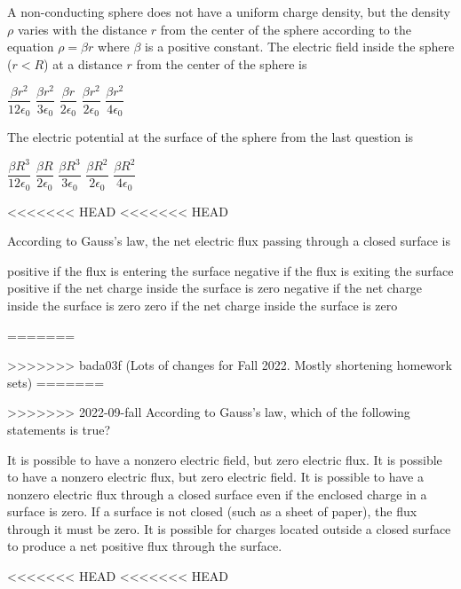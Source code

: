 \documentclass{../../oss-apphys-exam}
\newcounter{last}
\begin{document}
\genheader


\raggedcolumns

\begin{multicols*}{2}
  \begin{questions}

    \question A non-conducting sphere does not have a uniform charge density,
    but the density $\rho$ varies with the distance $r$ from the center of the
    sphere according to the equation $\rho=\beta r$ where $\beta$ is a positive
    constant. The electric field inside the sphere ($r<R$) at a distance $r$
    from the center of the sphere is
    \begin{choices}
      \choice $\dfrac{\beta r^2}{12\epsilon_0}$
      \choice $\dfrac{\beta r^2}{3\epsilon_0}$
      \choice $\dfrac{\beta r}{2\epsilon_0}$
      \choice $\dfrac{\beta r^2}{2\epsilon_0}$
      \choice $\dfrac{\beta r^2}{4\epsilon_0}$
    \end{choices}
 
    \question The electric potential at the surface of the sphere from the last
    question is
    \begin{choices}
      \choice $\dfrac{\beta R^3}{12\epsilon_0}$
      \choice $\dfrac{\beta R}{2\epsilon_0}$
      \choice $\dfrac{\beta R^3}{3\epsilon_0}$
      \choice $\dfrac{\beta R^2}{2\epsilon_0}$
      \choice $\dfrac{\beta R^2}{4\epsilon_0}$
    \end{choices}
<<<<<<< HEAD
<<<<<<< HEAD
    \columnbreak
    
    \question According to Gauss's law, the net electric flux passing through a
    closed surface is
    \begin{choices}
      \choice positive if the flux is entering the surface
      \choice negative if the flux is exiting the surface
      \choice positive if the net charge inside the surface is zero
      \choice negative if the net charge inside the surface is zero
      \choice zero if the net charge inside the surface is zero
    \end{choices}
    
=======

>>>>>>> bada03f (Lots of changes for Fall 2022. Mostly shortening homework sets)
=======

>>>>>>> 2022-09-fall
    \question According to Gauss's law, which of the following statements is
    true?
    \begin{choices}
      \choice It is possible to have a nonzero electric field, but zero electric
      flux.
      \choice It is possible to have a nonzero electric flux, but zero electric
      field.
      \choice It is possible to have a nonzero electric flux through a closed
      surface even if the enclosed charge in a surface is zero.
      \choice If a surface is not closed (such as a sheet of paper), the flux
      through it must be zero.
      \choice It is possible for charges located outside a closed surface to
      produce a net positive flux through the surface.
    \end{choices}
<<<<<<< HEAD
<<<<<<< HEAD
    

\end{questions}
\end{multicols*}
\end{document}
